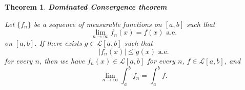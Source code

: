 \documentclass[12pt]{amsart}
\theoremstyle{plain}
\newtheorem{thm}{Theorem}[section]
\theoremstyle{definition}
\theoremstyle{remark}
\numberwithin{equation}{section}
\numberwithin{thm}{section}
\begin{document}
\begin{thm}
\textbf{Dominated Convergence theorem} 

Let $\{f_n\}$ be a sequence of measurable functions on $[a,b]$ such that 
\begin{equation*}
    \lim_{n \to \infty} f_{n}(x) = f(x) \text{ a.e.}
\end{equation*}
on $[a,b]$. If there exists $g \in \mathcal{L}[a,b]$ such that
\begin{equation*}
    |f_n(x)| \leq g(x) \text{ a.e.}
\end{equation*}
for every $n$, then we have $f_n(x) \in \mathcal{L}[a,b]$ for every $n$, $f \in \mathcal{L}[a,b]$, and 
\begin{equation*}
    \lim_{n \to \infty} \int_{a}^{b} f_n = \int_{a}^b f.
\end{equation*}
\end{thm}
\end{document}
